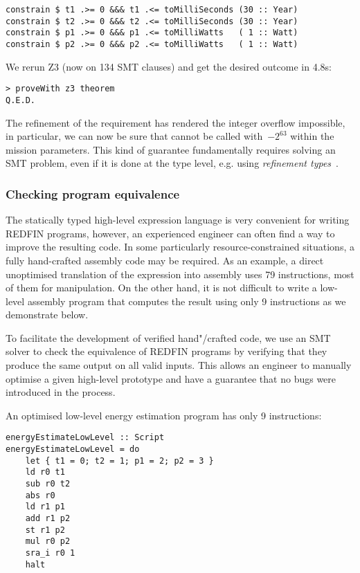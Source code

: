 \begin{verbatim}
constrain $ t1 .>= 0 &&& t1 .<= toMilliSeconds (30 :: Year)
constrain $ t2 .>= 0 &&& t2 .<= toMilliSeconds (30 :: Year)
constrain $ p1 .>= 0 &&& p1 .<= toMilliWatts   ( 1 :: Watt)
constrain $ p2 .>= 0 &&& p2 .<= toMilliWatts   ( 1 :: Watt)
\end{verbatim}


\noindent
We rerun Z3 (now on 134 SMT clauses) and get the desired outcome in 4.8s:


\begin{verbatim}
> proveWith z3 theorem
Q.E.D.
\end{verbatim}


\noindent
The refinement of the requirement has rendered the integer overflow impossible,
in particular, we can now be sure that  cannot be called with~$-2^{63}$
within the mission parameters. This kind of guarantee fundamentally requires
solving an SMT problem, even if it is done at the type level, e.g. using
\emph{refinement types}~\cite{vazou2014refinement}.


\subsubsection{Checking program equivalence}
The statically typed high-level expression language is very convenient for
writing REDFIN programs, however, an experienced engineer can often find a way
to improve the resulting code. In some particularly resource-constrained situations,
a fully hand-crafted assembly code may be required. As an example, a direct
unoptimised translation of the  expression into assembly uses
79 instructions, most of them for  manipulation.
On the other hand, it is not difficult to write a low-level assembly program that
computes the result using only 9 instructions as we demonstrate below.

To facilitate the development of verified hand"/crafted code, we use an SMT
solver to check the equivalence of REDFIN programs by verifying that they produce
the same output on all valid inputs. This allows an engineer to manually
optimise a given high-level prototype and have a guarantee that no bugs were
introduced in the process.

An optimised low-level energy estimation program has only 9 instructions:


\begin{verbatim}
energyEstimateLowLevel :: Script
energyEstimateLowLevel = do
    let { t1 = 0; t2 = 1; p1 = 2; p2 = 3 }
    ld r0 t1
    sub r0 t2
    abs r0
    ld r1 p1
    add r1 p2
    st r1 p2
    mul r0 p2
    sra_i r0 1
    halt
\end{verbatim}
\label{energyEstimateLowLevel}


